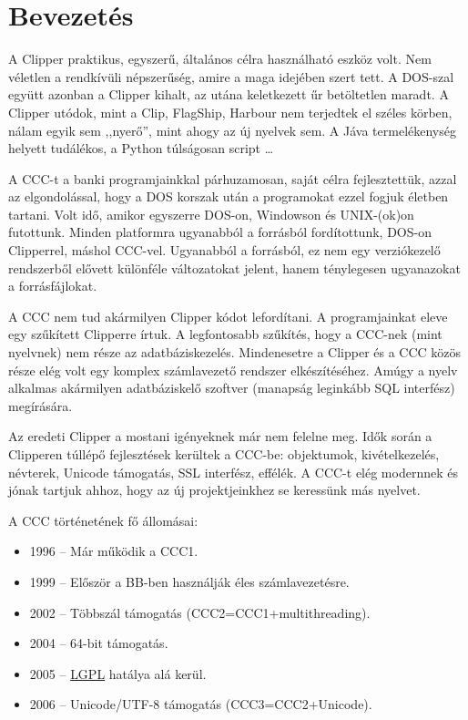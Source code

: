 

\section{Bevezetés}


A Clipper praktikus, egyszerű, általános célra használható eszköz volt. 
Nem véletlen a rendkívüli népszerűség, amire a maga idejében szert tett. 
A DOS-szal együtt azonban a Clipper kihalt,  az utána keletkezett űr 
betöltetlen maradt. A Clipper utódok, mint a Clip, FlagShip, Harbour nem 
terjedtek el széles körben, nálam egyik sem ,,nyerő'', mint ahogy az új nyelvek sem.
A Jáva termelékenység helyett tudálékos, a Python túlságosan script \ldots

A CCC-t a banki programjainkkal párhuzamosan, saját célra fejlesztettük,
azzal az elgondolással, hogy a DOS korszak után a programokat ezzel fogjuk 
életben tartani.
Volt idő, amikor egyszerre DOS-on, Windowson és UNIX-(ok)on  
futottunk. Minden platformra ugyanabból a forrásból fordítottunk,
DOS-on Clipperrel, máshol CCC-vel. Ugyanabból a forrásból,
ez nem egy verziókezelő rendszerből elővett különféle változatokat jelent, 
hanem ténylegesen ugyanazokat a forrásfájlokat.

A CCC nem tud akármilyen Clipper kódot lefordítani. A programjainkat 
eleve egy szűkített Clipperre írtuk. A legfontosabb szűkítés, 
hogy a CCC-nek (mint nyelvnek) nem része az adatbáziskezelés. 
Mindenesetre a Clipper és a CCC közös része elég volt egy komplex 
számlavezető rendszer elkészítéséhez.
Amúgy a nyelv alkalmas akármilyen adatbáziskelő szoftver 
(manapság leginkább SQL interfész) megírására. 


Az eredeti Clipper a mostani igényeknek már nem felelne meg.
Idők során a Clipperen túllépő fejlesztések kerültek a CCC-be: 
objektumok,
kivételkezelés,
névterek, 
Unicode támogatás, SSL interfész, effélék.
A CCC-t  elég modernnek és jónak tartjuk ahhoz, 
hogy az új projektjeinkhez se keressünk más nyelvet.

A CCC történetének fő állomásai:
\begin{itemize}
\item 1996 -- Már működik a CCC1. 
\item 1999 -- Először a BB-ben használják éles számlavezetésre.
\item 2002 -- Többszál támogatás (CCC2=CCC1+multithreading).
\item 2004 -- 64-bit támogatás.
\item 2005 -- \href{http://www.fsf.org/licensing/licenses/lgpl.txt}{LGPL} 
              hatálya alá kerül.
\item 2006 -- Unicode/UTF-8 támogatás (CCC3=CCC2+Unicode).
\end{itemize}

